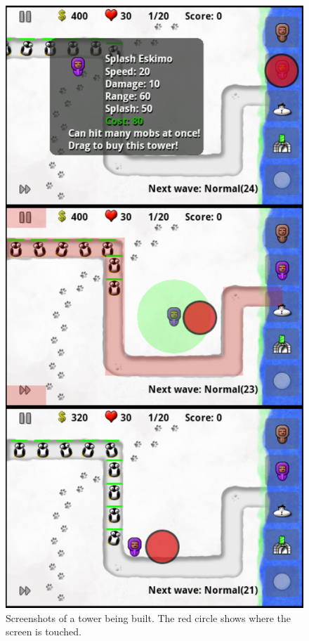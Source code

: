 \begin{figure}[here]
\begin{center}
\includegraphics[scale=0.3]{pics/chapters/chapter4/buildertowerallthree}
\end{center}
\caption{Screenshots of a tower being built. The red circle shows where the screen is touched.}
\label{fig:towerPlacement}
\end{figure}

